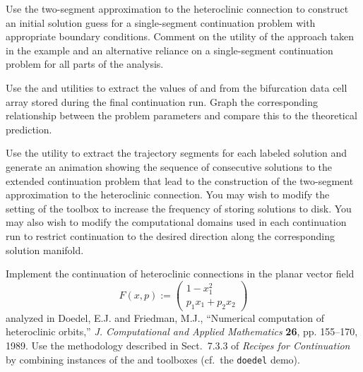 \begin{exercises}

\item Use the two-segment approximation to the heteroclinic connection to construct an initial solution guess for a single-segment continuation problem with appropriate boundary conditions. Comment on the utility of the approach taken in the example and an alternative reliance on a single-segment continuation problem for all parts of the analysis.

\item Use the  and  utilities to extract the values of  and  from the bifurcation data cell array stored during the final continuation run. Graph the corresponding relationship between the problem parameters and compare this to the theoretical prediction.

\item Use the  utility to extract the trajectory segments for each labeled solution and generate an animation showing the sequence of consecutive solutions to the extended continuation problem that lead to the construction of the two-segment approximation to the heteroclinic connection. You may wish to modify the  setting of the  toolbox to increase the frequency of storing solutions to disk. You may also wish to modify the computational domains used in each continuation run to restrict continuation to the desired direction along the corresponding solution manifold.

\item Implement the continuation of heteroclinic connections in the planar vector field
\[
F(x,p):=\left(\begin{array}{c}1-x_1^2\\p_1x_1+p_2x_2\end{array}\right)
\]
analyzed in Doedel, E.J. and Friedman, M.J., ``Numerical computation of heteroclinic
orbits,'' \emph{J. Computational and Applied Mathematics} \textbf{26}, pp. 155--170, 1989. Use the methodology described in Sect.~7.3.3 of \emph{Recipes for Continuation} by combining instances of the  and  toolboxes (cf.~the \texttt{doedel} demo).

\end{exercises}


